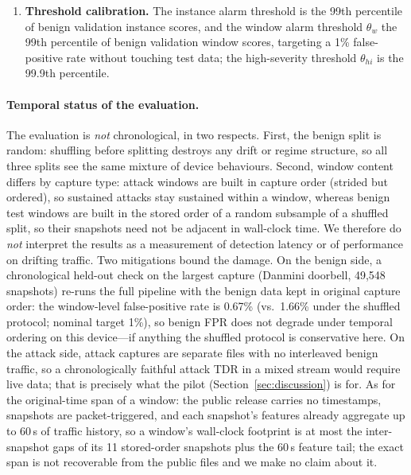 \documentclass[sigconf,review,anonymous]{acmart}
\begin{document}
\begin{enumerate}
\item \textbf{Threshold calibration.} The instance alarm threshold is the 99th percentile of benign validation instance scores, and the window alarm threshold $\theta_w$ the 99th percentile of benign validation window scores, targeting a 1\% false-positive rate without touching test data; the high-severity threshold $\theta_{hi}$ is the 99.9th percentile.
\end{enumerate}

\paragraph{Temporal status of the evaluation.} The evaluation is \emph{not} chronological, in two respects. First, the benign split is random: shuffling before splitting destroys any drift or regime structure, so all three splits see the same mixture of device behaviours. Second, window content differs by capture type: attack windows are built in capture order (strided but ordered), so sustained attacks stay sustained within a window, whereas benign test windows are built in the stored order of a random subsample of a shuffled split, so their snapshots need not be adjacent in wall-clock time. We therefore do \emph{not} interpret the results as a measurement of detection latency or of performance on drifting traffic. Two mitigations bound the damage. On the benign side, a chronological held-out check on the largest capture (Danmini doorbell, 49{,}548 snapshots) re-runs the full pipeline with the benign data kept in original capture order: the window-level false-positive rate is 0.67\% (vs.\ 1.66\% under the shuffled protocol; nominal target 1\%), so benign FPR does not degrade under temporal ordering on this device---if anything the shuffled protocol is conservative here. On the attack side, attack captures are separate files with no interleaved benign traffic, so a chronologically faithful attack TDR in a mixed stream would require live data; that is precisely what the pilot (Section~\ref{sec:discussion}) is for. As for the original-time span of a window: the public release carries no timestamps, snapshots are packet-triggered, and each snapshot's features already aggregate up to 60\,s of traffic history, so a window's wall-clock footprint is at most the inter-snapshot gaps of its 11 stored-order snapshots plus the 60\,s feature tail; the exact span is not recoverable from the public files and we make no claim about it.
\end{document}
